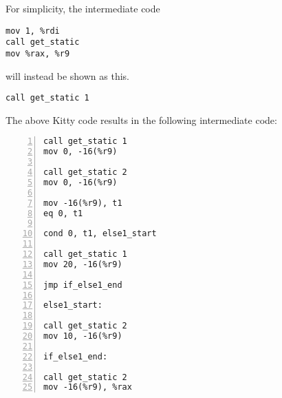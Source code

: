 \documentclass{article}
\begin{document}
For simplicity, the intermediate code 
\begin{lstlisting}
mov 1, %rdi
call get_static 
mov %rax, %r9
\end{lstlisting}

will instead be shown as this. 
\begin{lstlisting}
call get_static 1
\end{lstlisting}

The above Kitty code results in the following intermediate code:
\begin{lstlisting}[numbers=left, firstnumber=1]
call get_static 1
mov 0, -16(%r9)

call get_static 2
mov 0, -16(%r9)

mov -16(%r9), t1
eq 0, t1

cond 0, t1, else1_start

call get_static 1
mov 20, -16(%r9)

jmp if_else1_end

else1_start:

call get_static 2
mov 10, -16(%r9)

if_else1_end:

call get_static 2
mov -16(%r9), %rax
\end{lstlisting}

\end{document}
